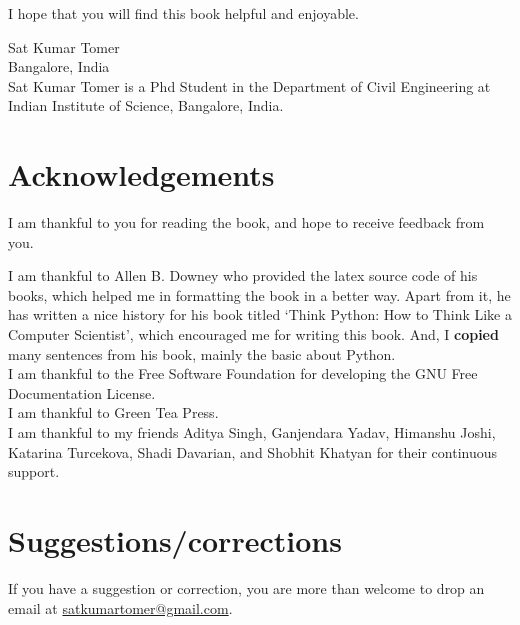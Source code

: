 \documentclass[10pt]{book}
\begin{document}
I hope that you will find this book helpful and enjoyable. \\

\vfill


Sat Kumar Tomer \\
Bangalore, India\\

Sat Kumar Tomer is a Phd Student in the Department of Civil Engineering at 
Indian Institute of Science, Bangalore, India.


\section*{Acknowledgements}

I am thankful to you for reading the book, and hope to receive feedback from you.

I am thankful to Allen B. Downey who provided the latex source code of his books, 
which helped me in formatting the book in a better way. Apart from it, 
he has written a nice history for his book titled `Think Python: How to Think Like
a Computer Scientist', which encouraged me for writing this book. 
And, I \textbf{copied} many sentences from his book, mainly the basic about Python. \\

I am thankful to the Free Software Foundation for developing the 
GNU Free Documentation License. \\

I am thankful to Green Tea Press. \\

I am thankful to my friends Aditya Singh, Ganjendara Yadav, 
Himanshu Joshi, Katarina Turcekova, Shadi Davarian, and Shobhit Khatyan 
for their continuous support. \\

\section*{Suggestions/corrections}
If you have a suggestion or correction, you are more than 
welcome to drop an email at \url{satkumartomer@gmail.com}. \\


\normalsize

\clearemptydoublepage

\begin{latexonly}

\tableofcontents

\clearemptydoublepage

\end{latexonly}
\end{document}

